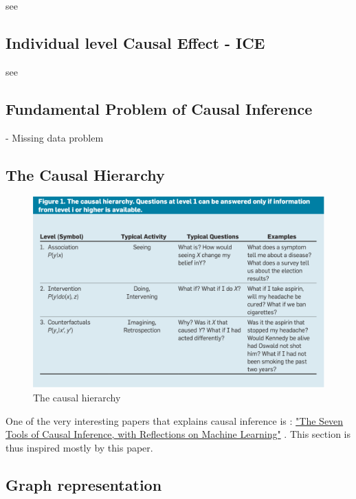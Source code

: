 \documentclass{article}
\begin{document}
see \cite{hernan2020causal}



\subsection{Individual level Causal Effect - ICE}

see \cite{hernan2020causal}


\subsection{Fundamental Problem of Causal Inference}

- Missing data problem 



\subsection{The Causal Hierarchy}


\begin{figure}[h]
\centering
\includegraphics[width=0.7 \textwidth]{figures/asso_inter_caus.png}
\caption{The causal hierarchy\cite{pearl2019seven}}
\end{figure}


One of the very interesting papers that explains causal inference is : \href{https://cacm.acm.org/magazines/2019/3/234929-the-seven-tools-of-causal-inference-with-reflections-on-machine-learning/fulltext?mobile=false}{"The Seven Tools of Causal Inference, with Reflections on Machine Learning"} \cite{pearl2019seven}. This section is thus inspired mostly by this paper.

\cite{pearl2019seven} 
 
 
 \subsection{Graph representation}
\end{document}
